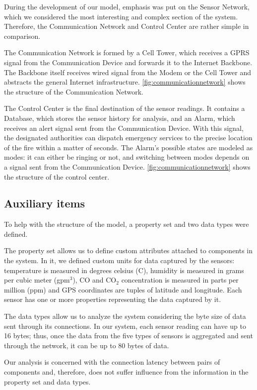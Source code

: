 During the development of our model, emphasis was put on the Sensor Network, which we considered the most interesting and complex section of the system. Therefore, the Communication Network and Control Center are rather simple in comparison.

The Communication Network is formed by a Cell Tower, which receives a GPRS signal from the Communication Device and forwards it to the Internet Backbone. The Backbone itself receives wired signal from the Modem or the Cell Tower and abstracts the general Internet infrastructure. \autoref{fig:communicationnetwork} shows the structure of the Communication Network.

The Control Center is the final destination of the sensor readings. It contains a Database, which stores the sensor history for analysis, and an Alarm, which receives an alert signal sent from the Communication Device. With this signal, the designated authorities can dispatch emergency services to the precise location of the fire within a matter of seconds. The Alarm's possible states are modeled as modes: it can either be ringing or not, and switching between modes depends on a signal sent from the Communication Device. \autoref{fig:communicationnetwork} shows the structure of the control center.

\subsection{Auxiliary items}

To help with the structure of the model, a property set and two data types were defined.

The property set allows us to define custom attributes attached to components in the system. 
In it, we defined custom units for data captured by the sensors: temperature is measured in degrees celsius (\degree C), 
humidity is measured in grams per cubic meter (gpm$^3$), 
CO and CO$_2$ concentration is measured in parts per million (ppm) and 
GPS coordinates are tuples of latitude and longitude. 
Each sensor has one or more properties representing the data captured by it.

The data types allow us to analyze the system considering the byte size of data sent through its connections. In our system, each sensor reading can have up to 16 bytes; thus, once the data from the five types of sensors is aggregated and sent through the network, it can be up to 80 bytes of data.

Our analysis is concerned with the connection latency between pairs of components and, therefore, does not suffer influence from the information in the property set and data types.


 